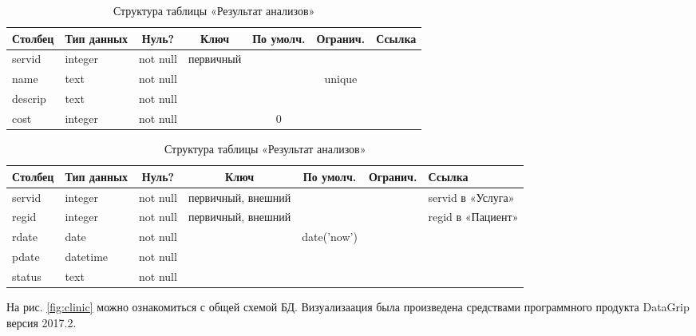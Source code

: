 \documentclass[14pt,a4paper,russian]{extreport}
\begin{document}
\begin{table}[h!]
    \caption{ } 
    \begin{subtable}[t]{\textwidth}
    \caption{Структура таблицы «Результат анализов»}
    \begin{tabularx}{\textwidth}{| X | X | c | c | c | c | X |}
        \hline
        \textbf{Столбец} & \textbf{Тип данных} & \textbf{Нуль?} & \textbf{Ключ} & \textbf{По
        умолч.} & \textbf{Огранич.} & \textbf{Ссылка} \\ \hline
        servid & integer & not null & первичный & & & \\ \hline
        name & text & not null & & & unique & \\ \hline
        descrip & text & not null & & & & \\ \hline
        cost & integer & not null & & 0 & & \\ \hline
    \end{tabularx}
    \end{subtable}
    \label{table:serv}
\end{table}

\begin{table}[h!]
    \caption{ } 
    \begin{subtable}[t]{\textwidth}
    \caption{Структура таблицы «Результат анализов»}
    \begin{tabularx}{\textwidth}{| X | X | c | c | c | c | X |}
        \hline
        \textbf{Столбец} & \textbf{Тип данных} & \textbf{Нуль?} & \textbf{Ключ} & \textbf{По
        умолч.} & \textbf{Огранич.} & \textbf{Ссылка} \\ \hline
        servid & integer & not null & первичный, внешний & & & servid в «Услуга»\\ \hline
        regid & integer & not null & первичный, внешний & & & regid в «Пациент» \\ \hline
        rdate & date & not null & & date('now') & & \\ \hline
        pdate & datetime & not null & & & & \\ \hline
        status & text & not null & & & & \\ \hline
    \end{tabularx}
    \end{subtable}
    \label{table:reserv}
\end{table}

\cleardoublepage
На рис. \ref{fig:clinic} можно ознакомиться с общей схемой БД. Визуализаация была
произведена средствами программного продукта DataGrip версия 2017.2.
\end{document}
